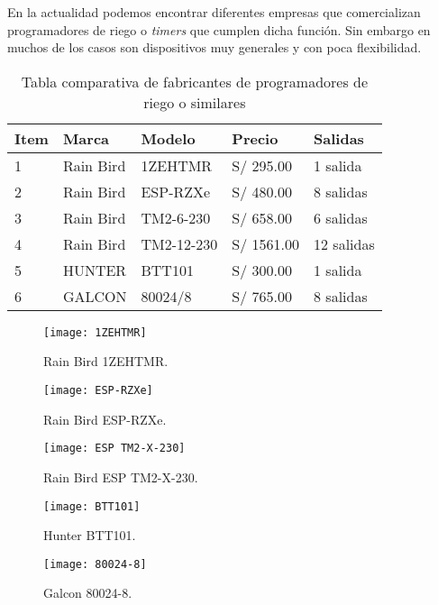 En la actualidad podemos encontrar diferentes empresas que comercializan programadores de riego o \textit{timers} que cumplen dicha función. Sin embargo en muchos de los casos son dispositivos muy generales y con poca flexibilidad.
\newline
\begin{table}[h]
	\begin{center}
		\begin{tabular}{ p{1cm} p{2cm} p{3cm} p{2cm} p{2cm} }

			\hline 
	 		\textbf{Item} & \textbf{Marca}  & \textbf{Modelo} & \textbf{Precio} & \textbf{Salidas}	\\
			\hline 
			1 & Rain Bird & 1ZEHTMR & S/ 295.00 & 1 salida	\\
			2 & Rain Bird & ESP-RZXe & S/ 480.00  & 8 salidas	\\
			3 & Rain Bird & TM2-6-230 & S/ 658.00  & 6 salidas	\\
			4 & Rain Bird & TM2-12-230 & S/ 1561.00  & 12 salidas	\\
			5 & HUNTER & BTT101 & S/ 300.00  & 1 salida	\\
			6 & GALCON & 80024/8 & S/ 765.00  & 8 salidas	\\
			\hline 
		\end{tabular}
		\caption{Tabla comparativa de fabricantes de programadores de riego o similares}
	\end{center}
\end{table}

\begin{figure}[h]
	\centering
	\texttt{[image: 1ZEHTMR]}
	\caption{Rain Bird 1ZEHTMR.}
\end{figure}

\begin{figure}[h]
	\centering
	\texttt{[image: ESP-RZXe]}
	\caption{Rain Bird ESP-RZXe.}
\end{figure}

\begin{figure}[h]
	\centering
	\texttt{[image: ESP TM2-X-230]}
	\caption{Rain Bird ESP TM2-X-230.}
\end{figure}

\begin{figure}[h]
	\centering
	\texttt{[image: BTT101]}
	\caption{Hunter BTT101.}
\end{figure}

\begin{figure}[h]
	\centering
	\texttt{[image: 80024-8]}
	\caption{Galcon 80024-8.}
\end{figure}
